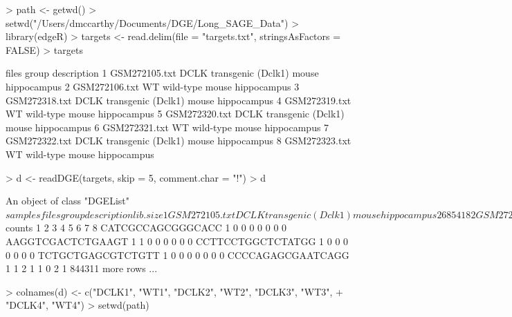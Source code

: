 \begin{Schunk}
\begin{Sinput}
> path <- getwd()
> setwd("/Users/dmccarthy/Documents/DGE/Long_SAGE_Data")
> library(edgeR)
> targets <- read.delim(file = "targets.txt", stringsAsFactors = FALSE)
> targets
\end{Sinput}
\begin{Soutput}
          files group                          description
1 GSM272105.txt  DCLK transgenic (Dclk1) mouse hippocampus
2 GSM272106.txt    WT          wild-type mouse hippocampus
3 GSM272318.txt  DCLK transgenic (Dclk1) mouse hippocampus
4 GSM272319.txt    WT          wild-type mouse hippocampus
5 GSM272320.txt  DCLK transgenic (Dclk1) mouse hippocampus
6 GSM272321.txt    WT          wild-type mouse hippocampus
7 GSM272322.txt  DCLK transgenic (Dclk1) mouse hippocampus
8 GSM272323.txt    WT          wild-type mouse hippocampus
\end{Soutput}
\begin{Sinput}
> d <- readDGE(targets, skip = 5, comment.char = "!")
> d
\end{Sinput}
\begin{Soutput}
An object of class "DGEList"
$samples
          files group                          description lib.size
1 GSM272105.txt  DCLK transgenic (Dclk1) mouse hippocampus  2685418
2 GSM272106.txt    WT          wild-type mouse hippocampus  3517977
3 GSM272318.txt  DCLK transgenic (Dclk1) mouse hippocampus  3202246
4 GSM272319.txt    WT          wild-type mouse hippocampus  3558260
5 GSM272320.txt  DCLK transgenic (Dclk1) mouse hippocampus  2460753
6 GSM272321.txt    WT          wild-type mouse hippocampus   294909
7 GSM272322.txt  DCLK transgenic (Dclk1) mouse hippocampus   651172
8 GSM272323.txt    WT          wild-type mouse hippocampus  3142280
  norm.factors
1            1
2            1
3            1
4            1
5            1
6            1
7            1
8            1

$counts
                  1 2 3 4 5 6 7 8
CATCGCCAGCGGGCACC 1 0 0 0 0 0 0 0
AAGGTCGACTCTGAAGT 1 1 0 0 0 0 0 0
CCTTCCTGGCTCTATGG 1 0 0 0 0 0 0 0
TCTGCTGAGCGTCTGTT 1 0 0 0 0 0 0 0
CCCCAGAGCGAATCAGG 1 1 2 1 1 0 2 1
844311 more rows ...
\end{Soutput}
\begin{Sinput}
> colnames(d) <- c("DCLK1", "WT1", "DCLK2", "WT2", "DCLK3", "WT3", 
+     "DCLK4", "WT4")
> setwd(path)
\end{Sinput}
\end{Schunk}

